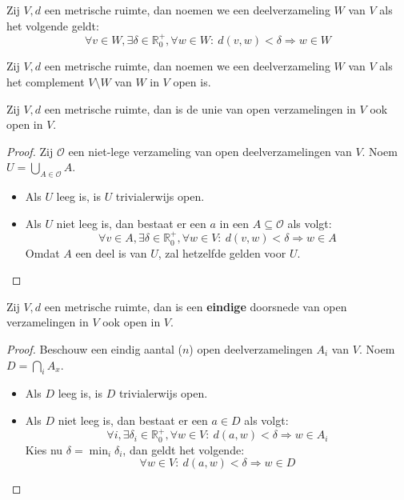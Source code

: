 \documentclass[main.tex]{subfiles}
\begin{document}





\begin{de}
  Zij $V,d$ een metrische ruimte, dan noemen we een deelverzameling $W$ van $V$  als het volgende geldt:
  \[ \forall v\in W, \exists \delta \in \mathbb{R}_{0}^{+}, \forall w\in W:\ d(v,w) < \delta \Rightarrow w \in W \]
\end{de}

\begin{de}
  Zij $V,d$ een metrische ruimte, dan noemen we een deelverzameling $W$ van $V$  als het complement $V\setminus W$ van $W$ in $V$ open is.
\end{de}


\begin{pr}
  Zij $V,d$ een metrische ruimte, dan is de unie van open verzamelingen in $V$ ook open in $V$.

  \begin{proof}
    Zij $\mathcal{O}$ een niet-lege verzameling van open deelverzamelingen van $V$.
    Noem $U = \bigcup_{A\in \mathcal{O}}A$.
    \begin{itemize}
    \item Als $U$ leeg is, is $U$ trivialerwijs open.
    \item Als $U$ niet leeg is, dan bestaat er een $a$ in een $A \subseteq \mathcal{O}$ als volgt:
      \[ \forall v\in A, \exists \delta \in \mathbb{R}_{0}^{+}, \forall w\in V:\ d(v,w) < \delta \Rightarrow w \in A \]
      Omdat $A$ een deel is van $U$, zal hetzelfde gelden voor $U$.
    \end{itemize}
  \end{proof}
\end{pr}

\begin{pr}
  Zij $V,d$ een metrische ruimte, dan is een \textbf{eindige} doorsnede van open verzamelingen in $V$ ook open in $V$.
  
  \begin{proof}
    Beschouw een eindig aantal ($n$) open deelverzamelingen $A_{i}$ van $V$.
    Noem $D = \bigcap_{i}A_{x}$.
    \begin{itemize}
    \item Als $D$ leeg is, is $D$ trivialerwijs open.
    \item Als $D$ niet leeg is, dan bestaat er een $a\in D$ als volgt:
      \[ \forall i, \exists \delta_{i} \in \mathbb{R}_{0}^{+}, \forall w\in V:\ d(a,w) < \delta \Rightarrow w \in A_{i} \]
      Kies nu $\delta = \min_{i}\delta_{i}$, dan geldt het volgende:
      \[ \forall w\in V:\ d(a,w) < \delta \Rightarrow w\in D \]
    \end{itemize}
  \end{proof}
\end{pr}
\end{document}
